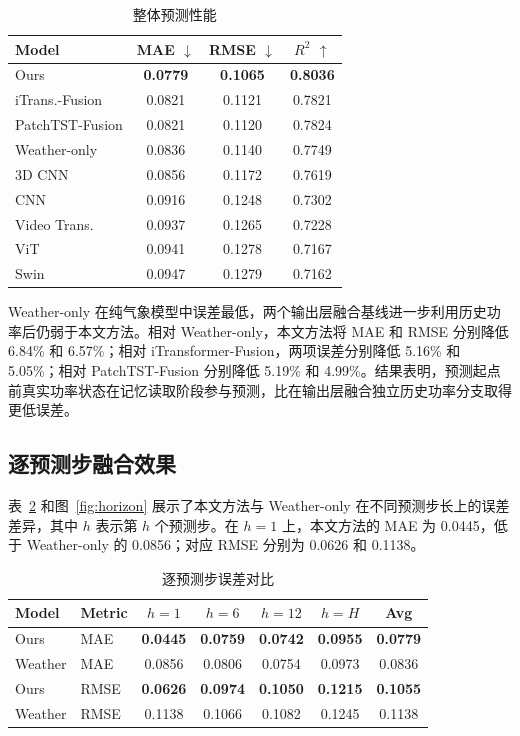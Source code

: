 \begin{table}[htbp]
\caption{整体预测性能}
\begin{center}
\footnotesize
\begin{tabular}{lccc}
\hline
Model & MAE \(\downarrow\) & RMSE \(\downarrow\) & \(R^2\) \(\uparrow\) \\
\hline
Ours & \textbf{0.0779} & \textbf{0.1065} & \textbf{0.8036} \\
iTrans.-Fusion & 0.0821 & 0.1121 & 0.7821 \\
PatchTST-Fusion & 0.0821 & 0.1120 & 0.7824 \\
Weather-only & 0.0836 & 0.1140 & 0.7749 \\
3D CNN & 0.0856 & 0.1172 & 0.7619 \\
CNN & 0.0916 & 0.1248 & 0.7302 \\
Video Trans. & 0.0937 & 0.1265 & 0.7228 \\
ViT & 0.0941 & 0.1278 & 0.7167 \\
Swin & 0.0947 & 0.1279 & 0.7162 \\
\hline
\end{tabular}
\label{tab:benchmark-short}
\end{center}
\end{table}

Weather-only 在纯气象模型中误差最低，两个输出层融合基线进一步利用历史功率后仍弱于本文方法。相对 Weather-only，本文方法将 MAE 和 RMSE 分别降低 6.84\% 和 6.57\%；相对 iTransformer-Fusion，两项误差分别降低 5.16\% 和 5.05\%；相对 PatchTST-Fusion 分别降低 5.19\% 和 4.99\%。结果表明，预测起点前真实功率状态在记忆读取阶段参与预测，比在输出层融合独立历史功率分支取得更低误差。

\subsection{逐预测步融合效果}

表~\ref{tab:horizon-short} 和图~\ref{fig:horizon} 展示了本文方法与 Weather-only 在不同预测步长上的误差差异，其中 \(h\) 表示第 \(h\) 个预测步。在 \(h=1\) 上，本文方法的 MAE 为 0.0445，低于 Weather-only 的 0.0856；对应 RMSE 分别为 0.0626 和 0.1138。

\begin{table}[htbp]
\caption{逐预测步误差对比}
\begin{center}
\footnotesize
\begin{tabular}{llccccc}
\hline
Model & Metric & \(h=1\) & \(h=6\) & \(h=12\) & \(h=H\) & Avg \\
\hline
Ours & MAE & \textbf{0.0445} & \textbf{0.0759} & \textbf{0.0742} & \textbf{0.0955} & \textbf{0.0779} \\
Weather & MAE & 0.0856 & 0.0806 & 0.0754 & 0.0973 & 0.0836 \\
Ours & RMSE & \textbf{0.0626} & \textbf{0.0974} & \textbf{0.1050} & \textbf{0.1215} & \textbf{0.1055} \\
Weather & RMSE & 0.1138 & 0.1066 & 0.1082 & 0.1245 & 0.1138 \\
\hline
\end{tabular}
\label{tab:horizon-short}
\end{center}
\end{table}

